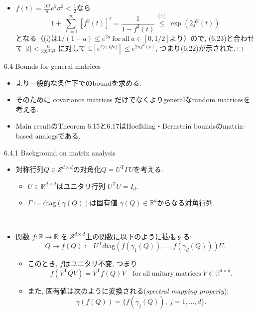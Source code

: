 \documentclass[unicode,aspectratio=169,11pt]{beamer}
\def\qed{\hfill $\Box$}
\newcommand{\ex}{\mathbb{E}}
\newcommand{\bb}{\mathbb}
\newcommand{\cc}{\mathcal}
\newcommand{\tr}{\mathrm{T}}
\begin{document}
\begin{frame}{}{}
  \begin{itemize}
    \item $f(t) = \frac{16t}{n}e^2 \sigma^2 < \frac{1}{2}$なら
      \[1+\sum_{\ell=1}^{\infty}\left[f^{2}(t)\right]^{\ell} = \frac{1}{1-f^{2}(t)} \stackrel{(\mathrm{i})}{\leq} \exp \left(2 f^{2}(t)\right)\]
      となる（(i)は$1/(1-a) \le e^{2a}\mathrm{\ for\ all\ }a \in [0,1/2]$より）ので,
      (6.23)と合わせて $|t| < \frac{n}{32 e^2 \sigma^2}$ に対して $\ex[e^{t \langle u, Qu \rangle}] \le e^{2nf^2(t)}$, つまり(6.22)が示された.\qed
  \end{itemize}
\end{frame}

\begin{frame}{6.4 Bounds for general matrices}{}
  \begin{itemize}
    \item より一般的な条件下でのboundを求める.
    \item そのために covariance matrices だけでなくよりgeneralなrandom matricesを考える.
    \item Main resultのTheorem 6.15と6.17はHoeffding・Bernstein boundsのmatrix-based analogsである.
  \end{itemize}
\end{frame}

\begin{frame}{6.4.1 Background on matrix analysis}{}
  　\\
  \begin{itemize}
    \item 対称行列$Q \in \cc{S}^{d\times d}$の対角化$Q = U^\tr \Gamma U$を考える:
    \begin{itemize}
      \item $U \in \bb{R}^{d\times d}$はユニタリ行列 $U^\tr U = I_d$.
      \item $\Gamma := \mathrm{diag}(\gamma(Q))$は固有値 $\gamma(Q) \in \bb{R}^d$からなる対角行列.
    \end{itemize}
    　\\
    \item 関数 $f : \bb{R} \to \bb{R}$ を $\cc{S}^{d\times d}$上の関数に以下のように拡張する:
          \[
              Q \mapsto f(Q) := U^\tr \mathrm{diag}(f(\gamma_1(Q)), \dots, f(\gamma_d(Q))) U.
          \]
          \begin{itemize}
            \item このとき, $f$はユニタリ不変, つまり
                  \[ f(V^\tr Q V) = V^\tr f(Q) V \quad \mathrm{for\ all\ unitary\ matrices\ } V \in \bb{R}^{d\times d}. \]
            \item また, 固有値は次のように変換される({\it spectral mapping property}):
                  \[ \gamma(f(Q)) = \{ f(\gamma_j(Q)),\ j=1,\dots,d \}. \]
          \end{itemize}
  \end{itemize}
\end{frame}
\end{document}
